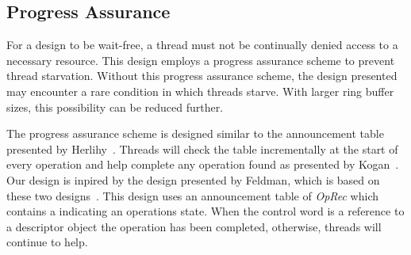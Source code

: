 \subsection{Progress Assurance}
	\label{sec:definitions:progress_assurance}

For a design to be wait-free, a thread must not be continually denied access to a necessary resource.
This design employs a progress assurance scheme to prevent thread starvation.
Without this progress assurance scheme, the design presented may encounter a rare condition in which threads starve.
With larger ring buffer sizes, this possibility can be reduced further.

The progress assurance scheme is designed similar to the announcement table presented by Herlihy~\cite{herlihy_table}.
Threads will check the table incrementally at the start of every operation and help complete any operation found as presented by Kogan~\cite{kogan_fpsp}.
Our design is inpired by the design presented by Feldman, which is based on these two designs~\cite{feldman_vector}. %
This design uses an announcement table of \emph{OpRec} which contains a  indicating an operations state.
When the control word is a reference to a descriptor object the operation has been completed, otherwise, threads will continue to help.




